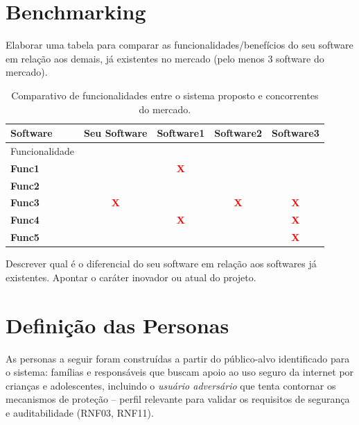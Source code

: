 \documentclass[
    12pt,           %
    oneside,        %
    a4paper,        %
    chapter=TITLE,  %
    english,        %
    brazil          %
]{abntex2}
\newcommand{\cmark}{\textcolor{green!60!black}{\ding{51}}}  %
\newcommand{\xmark}{\textcolor{red}{\textbf{X}}}            %
\begin{document}
\chapter{Benchmarking}

Elaborar uma tabela para comparar as funcionalidades/benefícios do seu software em
relação aos demais, já existentes no mercado (pelo menos 3 software do mercado).

\vspace{1em}

\begin{table}[h!]
\centering
\renewcommand{\arraystretch}{1.6}
\begin{tabular}{|p{3.5cm}|c|c|c|c|}
\hline
Software & \textbf{Seu Software} & \textbf{Software1} & \textbf{Software2} & \textbf{Software3} \\ \hline
Funcionalidade & & & & \\ \hline
\textbf{Func1} & \cmark & \xmark & \cmark & \cmark \\ \hline
\textbf{Func2} & \cmark & \cmark & \cmark & \cmark \\ \hline
\textbf{Func3} & \xmark & \cmark & \xmark & \xmark \\ \hline
\textbf{Func4} & \cmark & \xmark & \cmark & \xmark \\ \hline
\textbf{Func5} & \cmark & \cmark & \cmark & \xmark \\ \hline
\end{tabular}
\caption{Comparativo de funcionalidades entre o sistema proposto e concorrentes do mercado.}
\label{tab:benchmarking}
\end{table}

Descrever qual é o diferencial do seu software em relação aos softwares já existentes.
Apontar o caráter inovador ou atual do projeto.

\chapter{Definição das Personas}

As personas a seguir foram construídas a partir do público-alvo identificado
para o sistema: famílias e responsáveis que buscam apoio ao uso seguro da
internet por crianças e adolescentes, incluindo o \emph{usuário adversário}
que tenta contornar os mecanismos de proteção -- perfil relevante para
validar os requisitos de segurança e auditabilidade (RNF03, RNF11).
\end{document}
